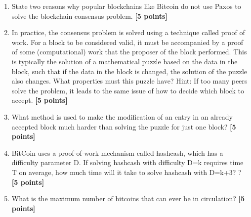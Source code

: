 \documentclass{article}
\begin{document}
\begin{enumerate}
\item{ State two reasons why popular blockchains like Bitcoin do not use Paxos to solve the blockchain consensus problem. \textbf{[5 points]}}

\item{ In practice, the consensus problem is solved using a technique called proof of work. For a block to be considered valid, it must be accompanied by a proof of some (computational) work that the proposer of the block performed. This is typically the solution of a mathematical puzzle based on the data in the block, such that if the data in the block is changed, the solution of the puzzle also changes. What properties must this puzzle have? Hint: If too many peers solve the problem, it leads to the same issue of how to decide which block to accept. \textbf{[5 points]}}

\item{ What method is used to make the modification of an entry in an already accepted block much harder than solving the puzzle for just one block? \textbf{[5 points]}}

\item{ BitCoin uses a proof-of-work mechanism called hashcash, which has a difficulty parameter D. If solving hashcash with difficulty D=k requires time T on average, how much time will it take to solve hashcash with D=k+3? ? \textbf{[5 points]}}

\item{ What is the maximum number of bitcoins that can ever be in circulation? \textbf{[5 points]}}
\end{enumerate}
\end{document}
